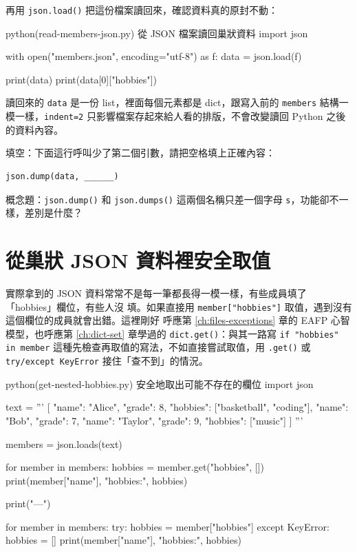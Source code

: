 再用 \texttt{json.load()} 把這份檔案讀回來，確認資料真的原封不動：

\begin{example}{python}{(read-members-json.py) 從 JSON 檔案讀回巢狀資料}
import json

with open("members.json", encoding="utf-8") as f:
    data = json.load(f)

print(data)
print(data[0]["hobbies"])
\end{example}


讀回來的 \texttt{data} 是一份 list，裡面每個元素都是 dict，跟寫入前的 \texttt{members}
結構一模一樣，\texttt{indent=2} 只影響檔案存起來給人看的排版，不會改變讀回 Python 之後
的資料內容。

\begin{drills}[label=drills:json-dump-load]
\item 填空：下面這行呼叫少了第二個引數，請把空格填上正確內容：
\begin{verbatim}
json.dump(data, ______)
\end{verbatim}
\item 概念題：\texttt{json.dump()} 和 \texttt{json.dumps()} 這兩個名稱只差一個字母
\texttt{s}，功能卻不一樣，差別是什麼？
\end{drills}

\section{從巢狀 JSON 資料裡安全取值}
\label{sec:json-nested}

實際拿到的 JSON 資料常常不是每一筆都長得一模一樣，有些成員填了「hobbies」欄位，有些人沒
填。如果直接用 \texttt{member["hobbies"]} 取值，遇到沒有這個欄位的成員就會出錯。這裡剛好
呼應第 \ref{ch:files-exceptions} 章的 EAFP 心智模型，也呼應第 \ref{ch:dict-set} 章學過的 \texttt{dict.get()}：與其一路寫
\texttt{if "hobbies" in member} 這種先檢查再取值的寫法，不如直接嘗試取值，用
\texttt{.get()} 或 \texttt{try/except KeyError} 接住「查不到」的情況。

\begin{example}{python}{(get-nested-hobbies.py) 安全地取出可能不存在的欄位}
import json

text = '''
[
    {"name": "Alice", "grade": 8, "hobbies": ["basketball", "coding"]},
    {"name": "Bob", "grade": 7},
    {"name": "Taylor", "grade": 9, "hobbies": ["music"]}
]
'''

members = json.loads(text)

for member in members:
    hobbies = member.get("hobbies", [])
    print(member["name"], "hobbies:", hobbies)

print("---")

for member in members:
    try:
        hobbies = member["hobbies"]
    except KeyError:
        hobbies = []
    print(member["name"], "hobbies:", hobbies)
\end{example}

